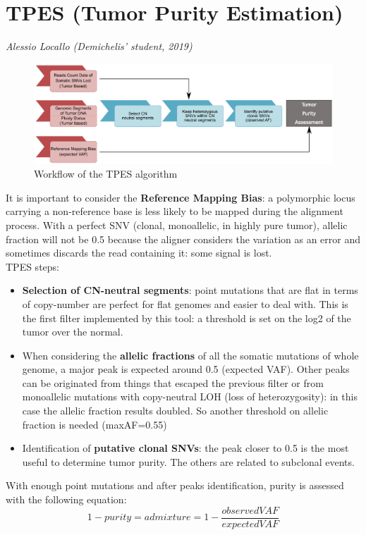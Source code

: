 \section{TPES (Tumor Purity Estimation)}
\textit{Alessio Locallo (Demichelis' student, 2019)}\\

\begin{figure}[!ht]
\centering
    \includegraphics[width=0.7\linewidth]{tpes.png}
    \caption{\label{fig:tpes}Workflow of the TPES algorithm}
\end{figure}

It is important to consider the \textbf{Reference Mapping Bias}: a polymorphic locus carrying a non-reference base is less likely to be mapped during the alignment process. With a perfect SNV (clonal, monoallelic, in highly pure tumor), allelic fraction will not be 0.5 because the aligner considers the variation as an error and sometimes discards the read containing it: some signal is lost.\\

TPES steps:
\begin{itemize}
    \item \textbf{Selection of CN-neutral segments}: point mutations that are flat in terms of copy-number are perfect for flat genomes and easier to deal with. This is the first filter implemented by this tool: a threshold is set on the log2 of the tumor over the normal.
    \item When considering the \textbf{allelic fractions} of all the somatic mutations of whole genome, a major peak is expected around 0.5 (expected VAF). Other peaks can be originated from things that escaped the previous filter or from monoallelic mutations with copy-neutral LOH (loss of heterozygosity): in this case the allelic fraction results doubled. So another threshold on allelic fraction is needed (maxAF=0.55)
    \item Identification of \textbf{putative clonal SNVs}: the peak closer to 0.5 is the most useful to determine tumor purity. The others are related to subclonal events.
\end{itemize}

With enough point mutations and after peaks identification, purity is assessed with the following equation:
\[ 1-purity = admixture = 1-\frac{observedVAF}{expectedVAF} \]

